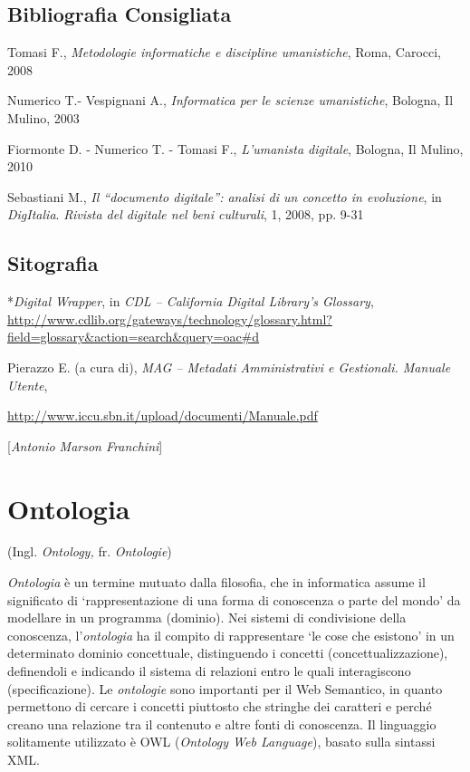 \section*{Bibliografia Consigliata}
{\parindent0pt 
Tomasi F., \emph{Metodologie informatiche e discipline umanistiche},
Roma, Carocci, 2008

Numerico T.- Vespignani A., \emph{Informatica per le scienze
umanistiche}, Bologna, Il Mulino, 2003

Fiormonte D. - Numerico T. - Tomasi F., \emph{L'umanista digitale},
Bologna, Il Mulino, 2010

Sebastiani M., \emph{Il ``documento digitale'': analisi di un concetto
in evoluzione}, in \emph{DigItalia}. \emph{Rivista del digitale nel beni
culturali}, 1, 2008, pp. 9-31
}

\section*{Sitografia}
{\parindent0pt 
*\emph{Digital Wrapper}, in \emph{CDL -- California Digital Library's
Glossary},
\url{http://www.cdlib.org/gateways/technology/glossary.html?field=glossary\&action=search\&query=oac\#d}

Pierazzo E. (a cura di), \emph{MAG -- Metadati Amministrativi e
Gestionali. Manuale Utente},

\url{http://www.iccu.sbn.it/upload/documenti/Manuale.pdf}
}

\hrulefill 

{[}\emph{Antonio Marson Franchini}{]}



\chapter{Ontologia}

(Ingl. \emph{Ontology,} fr. \emph{Ontologie})

\emph{Ontologia} è un termine mutuato dalla filosofia, che in
informatica assume il significato di `rappresentazione di una forma di
conoscenza o parte del mondo' da modellare in un programma (dominio).
Nei sistemi di condivisione della conoscenza, l'\emph{ontologia} ha il
compito di rappresentare `le cose che esistono' in un determinato
dominio concettuale, distinguendo i concetti (concettualizzazione),
definendoli e indicando il sistema di relazioni entro le quali
interagiscono (specificazione). Le \emph{ontologie} sono importanti per
il Web Semantico, in quanto permettono di cercare i concetti piuttosto
che stringhe dei caratteri e perché creano una relazione tra il
contenuto e altre fonti di conoscenza. Il linguaggio solitamente
utilizzato è OWL (\emph{Ontology Web Language}), basato sulla sintassi
XML.

